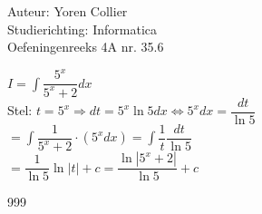 \documentclass[a4paper]{article}
\newcommand{\asa}{\Leftrightarrow} %
\newcommand{\adR}{\Rightarrow} %
\newcommand{\Lh}{\left(} %
\newcommand{\Rh}{\right)}
\newcommand{\intgrl}{\displaystyle\int} %
\begin{document}
\noindent \large Auteur: Yoren Collier \\
\noindent \large Studierichting: Informatica\\
\noindent \large Oefeningenreeks 4A nr. 35.6\\

\medskip

\normalsize

$ I =  \intgrl \dfrac{5^x}{5^x +2} dx$\\

Stel: $t = 5^x \adR dt = 5^x \ln 5dx \asa 5^x dx = \dfrac{dt}{\ln 5} $\\

$= \intgrl\dfrac{1}{5^x +2} \cdot \Lh 5^x dx \Rh = \intgrl\dfrac{1}{t} \dfrac{dt}{\ln 5}$\\

$= \dfrac{1}{\ln 5} \ln|t| +c = \dfrac{\ln |5^x +2|}{\ln 5} + c$\\

\begin{thebibliography}{999}
\end{thebibliography}
\end{document}
